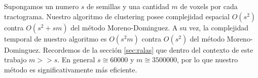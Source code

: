 Supongamos un numero $s$ de semillas y una cantidad $m$ de voxels por cada
tractograma. Nuestro algoritmo de clustering posee complejidad espacial $O(s^2)$
contra $O(s^2 + sm)$ del m\'etodo Moreno-Dominguez. A su vez, la complejidad 
temporal de nuestro algoritmo es $O(s^2m)$ contra $O(s^2)$ del m\'etodo 
Moreno-Dominguez. Recordemos de la secci\'on \ref{sec:ralas} que dentro del contexto
de este trabajo $m >> s$. En general $s \cong 60000$ y $m \cong 3500000$, por lo 
que nuestro m\'etodo es significativamente m\'as eficiente. \\

\blankpage
